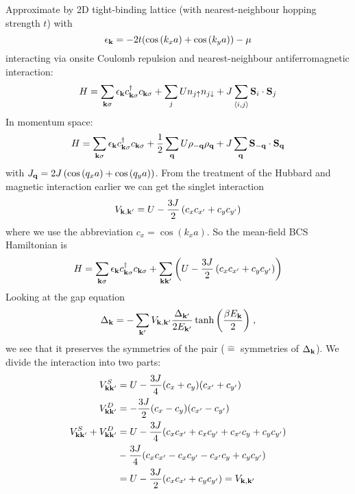 Approximate by 2D tight-binding lattice (with nearest-neighbour hopping strength \(t\)) with
\begin{equation}
    \epsilon_{\mathbf{k}} = -2t (\cos{(k_x a)} + \cos{(k_y a)}) - \mu
\end{equation}
interacting via onsite Coulomb repulsion and nearest-neighbour antiferromagnetic interaction:
\begin{equation}
    H = \sum_{\mathbf{k} \sigma} \epsilon_{\mathbf{k}} c_{\mathbf{k} \sigma}^{\dagger} c_{\mathbf{k} \sigma} + \sum_{j} U n_{j \uparrow} n_{j \downarrow} + J \sum_{\langle i, j \rangle} \mathbf{S}_{i} \cdot \mathbf{S}_{j}
\end{equation}
In momentum space:
\begin{equation}
    H = \sum_{\mathbf{k} \sigma} \epsilon_{\mathbf{k}} c_{\mathbf{k} \sigma}^{\dagger} c_{\mathbf{k} \sigma} + \frac{1}{2} \sum_{\mathbf{q}} U \rho_{-\mathbf{q}} \rho_{\mathbf{q}} + J \sum_{\mathbf{q}} \mathbf{S}_{-{\mathbf{q}}} \cdot \mathbf{S}_{\mathbf{q}}
\end{equation}
with \(J_{\mathbf{q}} = 2 J \left( \cos{(q_x a)} + \cos{(q_y a)} \right)\).
From the treatment of the Hubbard and magnetic interaction earlier we can get the singlet interaction   
\begin{equation}
    V_{\mathbf{k}, \mathbf{k}^{\prime}} = U - \frac{3 J}{2} \left( c_x c_{x^{\prime}} + c_y c_{y^{\prime}} \right)
\end{equation}
where we use the abbreviation \(c_x = \cos{(k_x a)}\).
So the mean-field BCS Hamiltonian is
\begin{equation}
    H = \sum_{\mathbf{k} \sigma} \epsilon_{\mathbf{k}} c_{\mathbf{k} \sigma}^{\dagger} c_{\mathbf{k} \sigma} + \sum_{\mathbf{k} \mathbf{k}^{\prime}}\left( U - \frac{3 J}{2} \left( c_x c_{x^{\prime}} + c_y c_{y^{\prime}} \right) \right)
\end{equation}
Looking at the gap equation
\begin{equation}
    \Delta_{\mathbf{k}} = - \sum_{\mathbf{k}^{\prime}} V_{\mathbf{k}, \mathbf{k}^{\prime}}  \frac{\Delta_{\mathbf{k}^{\prime}}}{2 E_{\mathbf{k}^{\prime}}} \tanh{\left(\frac{\beta E_{\mathbf{k}}}{2}\right)}
    \;,
\end{equation}
we see that it preserves the symmetries of the pair (\(\hat{=}\) symmetries of \(\Delta_{\mathbf{k}}\)).
We divide the interaction into two parts:
\begin{align}
    V_{\mathbf{k} \mathbf{k}^{\prime}}^S &= U - \frac{3 J}{4} (c_x + c_y)(c_{x^{\prime}} + c_{y^{\prime}}) \\
    V_{\mathbf{k} \mathbf{k}^{\prime}}^D &= -\frac{3 J}{2} (c_x - c_y)(c_{x^{\prime}} - c_{y^{\prime}}) \\
    V_{\mathbf{k} \mathbf{k}^{\prime}}^S + V_{\mathbf{k} \mathbf{k}^{\prime}}^D &= U - \frac{3 J}{4} (c_x c_{x^{\prime}} + c_x c_{y^{\prime}} + c_{x^{\prime}} c_y + c_y c_{y^{\prime}}) \\
    &- \frac{3 J}{4} (c_x c_{x^{\prime}} - c_x c_{y^{\prime}} - c_{x^{\prime}} c_y + c_y c_{y^{\prime}}) \\
    &= U - \frac{3 J}{2} (c_x c_{x^{\prime}} + c_y c_{y^{\prime}}) = V_{\mathbf{k}, \mathbf{k}^{\prime}}
\end{align}
